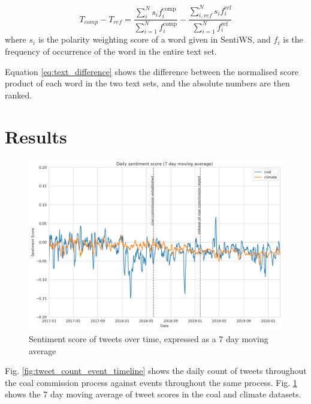 \documentclass[12pt,onecolumn,twoside]{layout}
\begin{document}
\begin{equation}
\label{eq:text_difference}
T_{comp} - T_{ref} = \frac{\sum_{i}^{N} s_i f_i^{\text{comp}}}{\sum_{i=1}^{N} f_i^{\text{comp}}} - \frac{\sum_{i,ref}^{N} s_i f_i^{\text{ref}}}{\sum_{i=1}^{N} f_i^{\text{ref}}}
\end{equation} 	
where \(s_i\) is the polarity weighting score of a word given in SentiWS, and \(f_i\) is the frequency of occurrence of the word in the entire text set. 

Equation \ref{eq:text_difference} shows the difference between the normalised score product of each word in the two text sets, and the absolute numbers are then ranked. 

 

\section*{Results} \label{sec:results}

\begin{figure} 
	\begin{center}
		\includegraphics[width=\linewidth]{figures/sa_dailyavgsenti_7dma_baseline2}
	\end{center}
	\caption{Sentiment score of tweets over time, expressed as a 7 day moving average}
	\label{fig:tweet_score}
\end{figure}

Fig. \ref{fig:tweet_count_event_timeline} shows the daily count of tweets throughout the coal commission process against events throughout the same process. Fig. \ref{fig:tweet_score} shows the 7 day moving average of tweet scores in the coal and climate datasets. 
\end{document}
